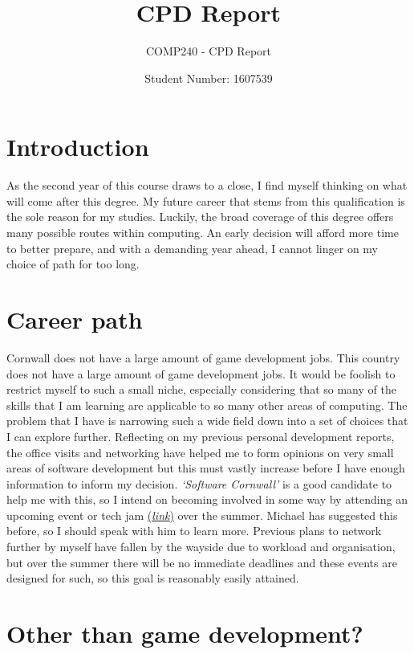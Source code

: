 \documentclass{scrartcl}
\title{CPD Report}
\subtitle{COMP240 - CPD Report}
\author{Student Number: 1607539}
\begin{document}
\maketitle

\section*{Introduction}

As the second year of this course draws to a close, I find myself thinking on what will come after this degree. My future career that stems from this qualification is the sole reason for my studies. Luckily, the broad coverage of this degree offers many possible routes within computing. An early decision will afford more time to better prepare, and with a demanding year ahead, I cannot linger on my choice of path for too long.
 
\section*{Career path}

Cornwall does not have a large amount of game development jobs. This country does not have a large amount of game development jobs. It would be foolish to restrict myself to such a small niche, especially considering that so many of the skills that I am learning are applicable to so many other areas of computing. The problem that I have is narrowing such a wide field down into a set of choices that I can explore further. Reflecting on my previous personal development reports, the office visits and networking have helped me to form opinions on very small areas of software development but this must vastly increase before I have enough information to inform my decision. \textit{`Software Cornwall'} is a good candidate to help me with this, so I intend on becoming involved in some way by attending an upcoming event or tech jam \href{https://www.softwarecornwall.org/events/}{(\textit{link})} over the summer. Michael has suggested this before, so I should speak with him to learn more. Previous plans to network further by myself have fallen by the wayside due to workload and organisation, but over the summer there will be no immediate deadlines and these events are designed for such, so this goal is reasonably easily attained.

\section*{Other than game development?}
\end{document}
